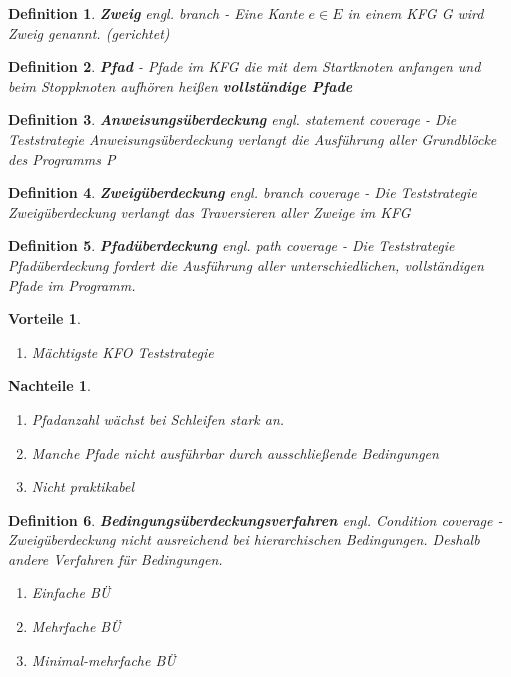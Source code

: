 \documentclass[a4paper]{article}
\theoremstyle{break}
\newtheorem{defi}{Definition}[section]
\newtheorem{why}{Vorteile}[section]
\newtheorem{whynot}{Nachteile}[section]
\begin{document}
        \begin{defi}
          \textbf{Zweig} \textit{engl. branch}  - Eine Kante \(e \in E\) in einem KFG G wird Zweig genannt. (gerichtet)
        \end{defi}

        \begin{defi}
          \textbf{Pfad} - Pfade im KFG die mit dem Startknoten anfangen und beim Stoppknoten aufhören heißen \textbf{vollständige Pfade}
        \end{defi}

        \begin{defi}
          \textbf{Anweisungsüberdeckung} \textit{engl. statement coverage} - Die Teststrategie Anweisungsüberdeckung verlangt die Ausführung aller Grundblöcke des Programms P
        \end{defi}

        \begin{defi}
          \textbf{Zweigüberdeckung} \textit{engl. branch coverage} - Die Teststrategie Zweigüberdeckung verlangt das Traversieren aller Zweige im KFG
        \end{defi}

        \begin{defi}
          \textbf{Pfadüberdeckung} \textit{engl. path coverage} - Die Teststrategie Pfadüberdeckung fordert die Ausführung aller unterschiedlichen, vollständigen Pfade im Programm.
        \end{defi}

        \begin{why}
          \begin{enumerate}
          \item Mächtigste KFO Teststrategie
          \end{enumerate}
        \end{why}
        
        \begin{whynot}
          \begin{enumerate}
          \item Pfadanzahl wächst bei Schleifen stark an.
          \item Manche Pfade nicht ausführbar durch ausschließende Bedingungen
          \item Nicht praktikabel
          \end{enumerate}
        \end{whynot}

        \begin{defi}
          \textbf{Bedingungsüberdeckungsverfahren} \textit{engl. Condition coverage} - Zweigüberdeckung nicht ausreichend bei hierarchischen Bedingungen. Deshalb andere Verfahren für Bedingungen.
          \begin{enumerate}
          \item Einfache BÜ
          \item Mehrfache BÜ
          \item Minimal-mehrfache BÜ
          \end{enumerate}
        \end{defi}
\end{document}
